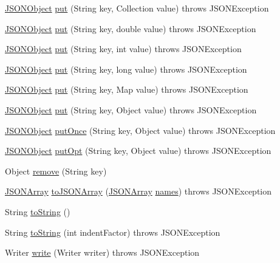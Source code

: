 \begin{DoxyCompactItemize}
\hyperlink{classorg_1_1json_1_1_j_s_o_n_object}{J\-S\-O\-N\-Object} \hyperlink{classorg_1_1json_1_1_j_s_o_n_object_ac5829feb500547a73f7ba1d0a090b9dc}{put} (String key, Collection value)  throws J\-S\-O\-N\-Exception 
\item 
\hyperlink{classorg_1_1json_1_1_j_s_o_n_object}{J\-S\-O\-N\-Object} \hyperlink{classorg_1_1json_1_1_j_s_o_n_object_a669cae1e6dd7bcab4a55d4a7078a0e72}{put} (String key, double value)  throws J\-S\-O\-N\-Exception 
\item 
\hyperlink{classorg_1_1json_1_1_j_s_o_n_object}{J\-S\-O\-N\-Object} \hyperlink{classorg_1_1json_1_1_j_s_o_n_object_a36a08204331752dffedc6e9d1b6aa297}{put} (String key, int value)  throws J\-S\-O\-N\-Exception 
\item 
\hyperlink{classorg_1_1json_1_1_j_s_o_n_object}{J\-S\-O\-N\-Object} \hyperlink{classorg_1_1json_1_1_j_s_o_n_object_a5807cd038e9ae979a692db1b99461205}{put} (String key, long value)  throws J\-S\-O\-N\-Exception 
\item 
\hyperlink{classorg_1_1json_1_1_j_s_o_n_object}{J\-S\-O\-N\-Object} \hyperlink{classorg_1_1json_1_1_j_s_o_n_object_a31371313d65f4239673c3cb521489176}{put} (String key, Map value)  throws J\-S\-O\-N\-Exception 
\item 
\hyperlink{classorg_1_1json_1_1_j_s_o_n_object}{J\-S\-O\-N\-Object} \hyperlink{classorg_1_1json_1_1_j_s_o_n_object_a2af440c4653ad8a23b0ac5ded37cd4d5}{put} (String key, Object value)  throws J\-S\-O\-N\-Exception 
\item 
\hyperlink{classorg_1_1json_1_1_j_s_o_n_object}{J\-S\-O\-N\-Object} \hyperlink{classorg_1_1json_1_1_j_s_o_n_object_ac6cc7fe095a7711be90f2e02163ef49e}{put\-Once} (String key, Object value)  throws J\-S\-O\-N\-Exception 
\item 
\hyperlink{classorg_1_1json_1_1_j_s_o_n_object}{J\-S\-O\-N\-Object} \hyperlink{classorg_1_1json_1_1_j_s_o_n_object_a023672439a8c851a663a183120fc126e}{put\-Opt} (String key, Object value)  throws J\-S\-O\-N\-Exception 
\item 
Object \hyperlink{classorg_1_1json_1_1_j_s_o_n_object_af4faca830e4bb6a00bccad695bd58c4d}{remove} (String key)
\item 
\hyperlink{classorg_1_1json_1_1_j_s_o_n_array}{J\-S\-O\-N\-Array} \hyperlink{classorg_1_1json_1_1_j_s_o_n_object_acafa0ef1407022894738177b3195e9f3}{to\-J\-S\-O\-N\-Array} (\hyperlink{classorg_1_1json_1_1_j_s_o_n_array}{J\-S\-O\-N\-Array} \hyperlink{classorg_1_1json_1_1_j_s_o_n_object_a02e83de70e290231527d1760c4dd30fc}{names})  throws J\-S\-O\-N\-Exception 
\item 
String \hyperlink{classorg_1_1json_1_1_j_s_o_n_object_a7f8cab6eb354ceb416a421574b4be424}{to\-String} ()
\item 
String \hyperlink{classorg_1_1json_1_1_j_s_o_n_object_a56087516560b91c8aebbba67efda1a61}{to\-String} (int indent\-Factor)  throws J\-S\-O\-N\-Exception 
\item 
Writer \hyperlink{classorg_1_1json_1_1_j_s_o_n_object_ac810606f683376f15962ed9b32db9eba}{write} (Writer writer)  throws J\-S\-O\-N\-Exception 
\end{DoxyCompactItemize}
